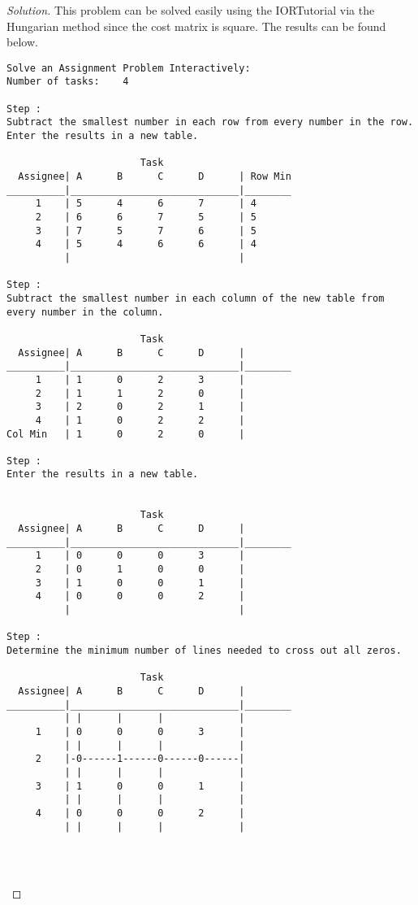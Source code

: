 \documentclass[titlepage, letterpaper, fleqn]{article}
\renewcommand\qedsymbol{\(\blacksquare\)}
\newenvironment{solution}
{\renewcommand\qedsymbol{$\square$}\begin{proof}[Solution]}
{\end{proof}}
\begin{document}
\begin{solution}
This problem can be solved easily using the IORTutorial via the Hungarian method since the cost matrix is square.
The results can be found below.

\begin{lstlisting}[basicstyle=\tiny]
Solve an Assignment Problem Interactively:
Number of tasks:    4

Step :
Subtract the smallest number in each row from every number in the row.
Enter the results in a new table.

                       Task
  Assignee| A      B      C      D      | Row Min
__________|_____________________________|________
     1    | 5      4      6      7      | 4
     2    | 6      6      7      5      | 5
     3    | 7      5      7      6      | 5
     4    | 5      4      6      6      | 4
          |                             | 

Step :
Subtract the smallest number in each column of the new table from every number in the column.

                       Task
  Assignee| A      B      C      D      |
__________|_____________________________|________
     1    | 1      0      2      3      | 
     2    | 1      1      2      0      | 
     3    | 2      0      2      1      | 
     4    | 1      0      2      2      | 
Col Min   | 1      0      2      0      | 

Step :
Enter the results in a new table.


                       Task
  Assignee| A      B      C      D      |
__________|_____________________________|________
     1    | 0      0      0      3      | 
     2    | 0      1      0      0      | 
     3    | 1      0      0      1      | 
     4    | 0      0      0      2      | 
          |                             | 

Step :
Determine the minimum number of lines needed to cross out all zeros.

                       Task
  Assignee| A      B      C      D      |
__________|_____________________________|________
          | |      |      |             |
     1    | 0      0      0      3      |
          | |      |      |             |
     2    |-0------1------0------0------|
          | |      |      |             |
     3    | 1      0      0      1      |
          | |      |      |             |
     4    | 0      0      0      2      |
          | |      |      |             |




\end{lstlisting}
\end{solution}
\end{document}
